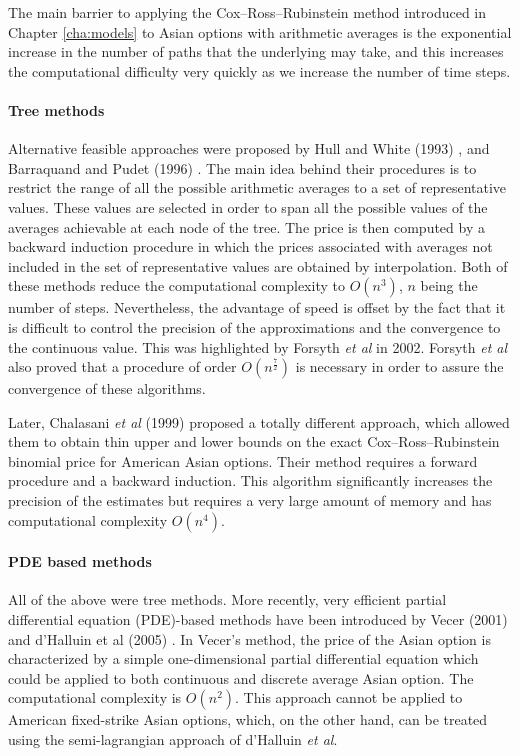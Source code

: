 The main barrier to applying the Cox–Ross–Rubinstein method \cite{Cox1979} introduced in Chapter \ref{cha:models} to Asian options with arithmetic averages is the exponential increase in the number of paths that the underlying may take, and this increases the computational difficulty very quickly as we increase the number of time steps.

\paragraph{Tree methods}
Alternative feasible approaches were proposed by Hull and White (1993) \cite{Hull1993}, and Barraquand and Pudet (1996) \cite{Barraquand1996}. The main idea behind their procedures is to restrict the range of all the possible arithmetic averages to a set of representative values. These values are selected in order to span all the possible values of the averages achievable at each node of the tree. The price is then computed by a backward induction procedure in which the prices associated with averages not included in the set of representative values are obtained by interpolation. Both of these methods reduce the computational complexity to $ O(n^3) $, $ n $ being the number of steps. Nevertheless, the advantage of speed is offset by the fact that it is difficult to control the precision of the approximations and the convergence to the continuous value. This was highlighted by Forsyth \emph{et al} \cite{Forsyth2002} in 2002. Forsyth \emph{et al} also proved that a procedure of order $ O(n^{\frac{7}{2}}) $ is necessary in order to assure the convergence of these algorithms.

Later, Chalasani \emph{et al} (1999) \cite{Chalasani1999} proposed a totally different approach, which allowed them to obtain thin upper and lower bounds on the exact Cox–Ross–Rubinstein binomial price for American Asian options. Their method requires a forward procedure and a backward induction. This algorithm significantly increases the precision of the estimates but requires a very large amount of memory and has computational complexity $ O(n^4) $.

\paragraph{PDE based methods}
All of the above were tree methods. More recently, very efficient partial differential equation (PDE)-based methods have been introduced by Vecer (2001) \cite{Vecer2001} and d'Halluin et al (2005) \cite{dHalluin2005}. In Vecer's method, the price of the Asian option is characterized by a simple one-dimensional partial differential equation which could be applied to both continuous and discrete average Asian option. The computational complexity is $ O(n^2) $. This approach cannot be applied to American fixed-strike Asian options, which, on the other hand, can be treated using the semi-lagrangian approach of d'Halluin \emph{et al}.


